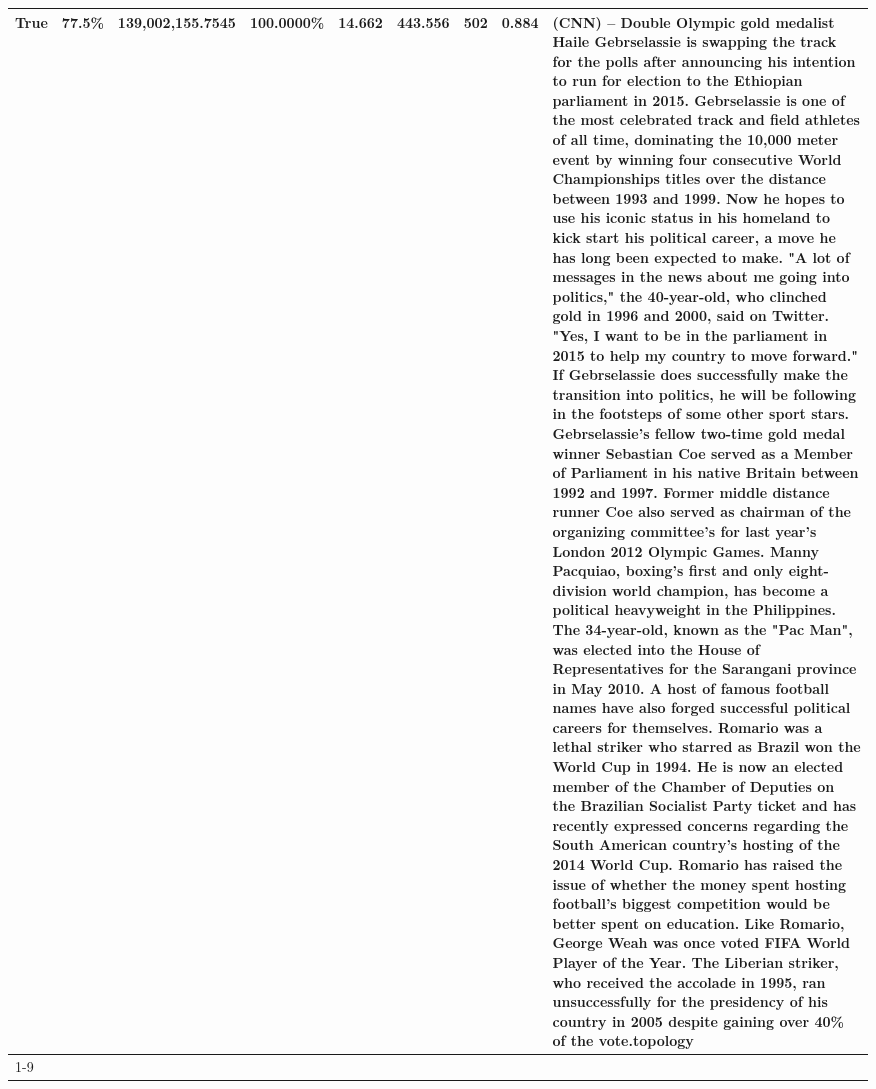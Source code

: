 \begin{table}[H]
{\begin{tabular}{lllrlllll}
True & 77.5\% & 139,002,155.7545 & \bfseries \color{red} 100.0000\% & 14.662 & 443.556 & 502 & 0.884 & (CNN) -- Double Olympic gold medalist Haile Gebrselassie is swapping the track for the polls after announcing his intention to run for election to the Ethiopian parliament in 2015. Gebrselassie is one of the most celebrated track and field athletes of all time, dominating the 10,000 meter event by winning four consecutive World Championships titles over the distance between 1993 and 1999. Now he hopes to use his iconic status in his homeland to kick start his political career, a move he has long been expected to make. "A lot of messages in the news about me going into politics," the 40-year-old, who clinched gold in 1996 and 2000, said on Twitter. "Yes, I want to be in the parliament in 2015 to help my country to move forward." If Gebrselassie does successfully make the transition into politics, he will be following in the footsteps of some other sport stars. Gebrselassie's fellow two-time gold medal winner Sebastian Coe served as a Member of Parliament in his native Britain between 1992 and 1997. Former middle distance runner Coe also served as chairman of the organizing committee's for last year's London 2012 Olympic Games. Manny Pacquiao, boxing's first and only eight-division world champion, has become a political heavyweight in the Philippines. The 34-year-old, known as the "Pac Man", was elected into the House of Representatives for the Sarangani province in May 2010. A host of famous football names have also forged successful political careers for themselves. Romario was a lethal striker who starred as Brazil won the World Cup in 1994. He is now an elected member of the Chamber of Deputies on the Brazilian Socialist Party ticket and has recently expressed concerns regarding the South American country's hosting of the 2014 World Cup. Romario has raised the issue of whether the money spent hosting football's biggest competition would be better spent on education. Like Romario, George Weah was once voted FIFA World Player of the Year. The Liberian striker, who received the accolade in 1995, ran unsuccessfully for the presidency of his country in 2005 despite gaining over 40\% of the vote.topology \\
\cline{1-9}

\end{tabular}}
\end{table}
